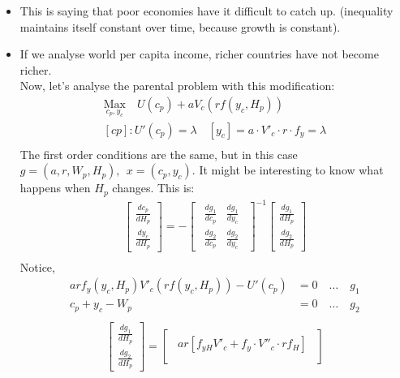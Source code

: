 \documentclass[14pt,notitlepage]{article}
\begin{document}
\begin{itemize}
\item This is saying that poor economies have it difficult to catch up. (inequality maintains itself constant over time, because growth is constant).
\item If we analyse world per capita income, richer countries have not become richer.\\
Now, let's analyse the parental problem with this modification:
\begin{align*}
\underset{c_p,y_c}{\text{Max}} \quad U(c_p) + a V_c (r f(y_c, H_p))\\
[cp] : U'(c_p) = \lambda \quad [y_c] = a \cdot V'_c \cdot r \cdot f_y = \lambda \\
\end{align*}
The first order conditions are the same, but in this case $g = (a, r, W_p, H_p),\ \ x= (c_p, y_c)$. It might be interesting to know what happens when $H_p$ changes. This is:
\begin{align*}
\begin{bmatrix}
    \frac{dc_p}{dH_p} \\
    \frac{dy_c}{dH_p}
\end{bmatrix} = - \begin{bmatrix}
                    \ \ \frac{dg_1}{dc_p} & \frac{dg_1}{dy_c}\ \ \\
                    \ \ \frac{dg_2}{dc_p} & \frac{dg_2}{dy_c}\ \
                  \end{bmatrix}^{-1} \begin{bmatrix}
                                        \frac{dg_1}{dH_p} \\
                                        \frac{dg_2}{dH_p}
                                     \end{bmatrix}\\
\end{align*}
Notice,
\begin{align*}
a r f_y(y_c, H_p) V'_c (r f(y_c, H_p)) - U'(c_p) &= 0 \quad \ldots \quad g_1 \\
c_p + y_c - W_p &= 0 \quad \ldots \quad g_2 \\
\end{align*}
\begin{align*}
\begin{bmatrix}
    \frac{dg_1}{dH_p} \\
    \frac{dg_2}{dH_p}
\end{bmatrix} = \begin{bmatrix}
                    \ \ a r [f_{yH} V'_c + f_y \cdot V''_c \cdot r f_H]\ \ \\

\end{bmatrix}
\end{align*}
\end{itemize}
\end{document}
